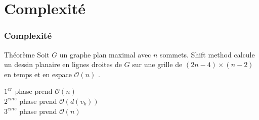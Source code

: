 \documentclass[10pt]{beamer}
\begin{document}

\section[Complexité]{Complexité}

\begin{frame}
	\frametitle{Complexité}
\begin{block}{Théorème \cite{FraysseixPachPollack} \cite{ChrobakPayne}} 
 Soit $G$ un graphe plan maximal avec $n$ sommets. Shift method calcule un dessin planaire en lignes droites de $G$ sur une grille de $(2n - 4) × (n - 2)$ en temps et en espace $\mathcal{O}(n)$ .
\end{block}

\begin{minipage}{0.4\textwidth}
    \begin{block}{}
        $1^{er}$  phase prend $\mathcal{O}(n)$ \\
        $2^{eme}$ phase prend $\mathcal{O}(d(v_k))$ \\ 
        $3^{eme}$ phase prend $\mathcal{O}(n)$
    \end{block}
\end{minipage}
        
\end{frame}	
\end{document}
